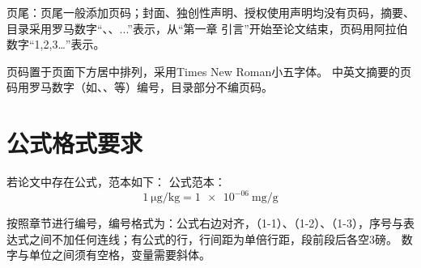 页尾：页尾一般添加页码；封面、独创性声明、授权使用声明均没有页码，摘要、目录采用罗马数字“\uppercase\expandafter{}、\uppercase\expandafter{}、\uppercase\expandafter{}...”表示，从“第一章 引言”开始至论文结束，页码用阿拉伯数字“1,2,3…”表示。

页码置于页面下方居中排列，采用Times New Roman小五字体。
中英文摘要的页码用罗马数字（如\uppercase\expandafter{}、\uppercase\expandafter{}、\uppercase\expandafter{}等）编号，目录部分不编页码。

\section{公式格式要求}

若论文中存在公式，范本如下：
公式范本：
\begin{equation}
    1~\unit{\ug\per\kg} = \num{1e-06}~\unit{\mg\per\g}
\end{equation}

按照章节进行编号，编号格式为：公式右边对齐，（1-1）、（1-2）、（1-3），序号与表达式之间不加任何连线；有公式的行，行间距为单倍行距，段前段后各空3磅。
数字与单位之间须有空格，变量需要斜体。
